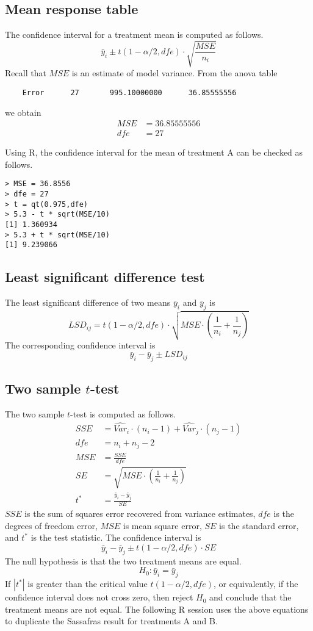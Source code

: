 \documentclass[12pt]{article}
\begin{document}
\subsection*{Mean response table}
The confidence interval for a treatment mean is computed as follows.
\[
\bar y_i\pm t(1-\alpha/2,dfe)\cdot\sqrt{\frac{MSE}{n_i}}
\]
Recall that $MSE$ is an estimate of model variance.
From the anova table

\begin{Verbatim}
    Error      27       995.10000000      36.85555556
\end{Verbatim}

we obtain
\begin{align*}
MSE&=36.85555556\\
dfe&=27
\end{align*}

Using R, the confidence interval for the mean of treatment A can be
checked as follows.

\begin{Verbatim}
> MSE = 36.8556
> dfe = 27
> t = qt(0.975,dfe)
> 5.3 - t * sqrt(MSE/10)
[1] 1.360934
> 5.3 + t * sqrt(MSE/10)
[1] 9.239066
\end{Verbatim}

\subsection*{Least significant difference test}
The least significant difference of two means
$\bar y_i$ and $\bar y_j$ is
\[
LSD_{ij}=t(1-\alpha/2,dfe)\cdot\sqrt{MSE\cdot
\left(\frac{1}{n_i}+\frac{1}{n_j}\right)}
\]
The corresponding confidence interval is
\[
\bar y_i-\bar y_j\pm LSD_{ij}
\]

\subsection*{Two sample $t$-test}
The two sample $t$-test is computed as follows.
\begin{align*}
SSE&=\widehat{Var}_i\cdot(n_i-1)+\widehat{Var}_j\cdot(n_j-1)\\
dfe&=n_i+n_j-2\\
MSE&=\frac{SSE}{dfe}\\
SE&=\sqrt{MSE\cdot\left(\frac{1}{n_i}+\frac{1}{n_j}\right)}\\
t^*&=\frac{\bar y_i-\bar y_j}{SE}
\end{align*}
$SSE$ is the sum of squares error recovered from
variance estimates, $dfe$ is the degrees of freedom error, $MSE$
is mean square error, $SE$ is the standard error, and $t^*$ is the
test statistic.
The confidence interval is
\[
\bar y_i-\bar y_j\pm t(1-\alpha/2,dfe)\cdot SE
\]
The null hypothesis is that the two treatment means are equal.
\[
H_0:\bar y_i=\bar y_j
\]
If $|t^*|$ is greater than the critical value $t(1-\alpha/2,dfe)$,
or equivalently, if the confidence interval does not cross zero,
then reject $H_0$ and conclude that the treatment means are not equal.
The following R session uses the above equations
to duplicate the Sassafras result for
treatments A and B.
\end{document}
